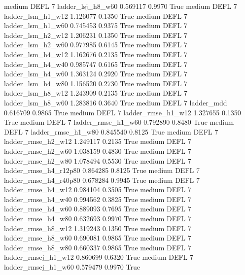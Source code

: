     medium     DEFL                 7      ladder_lsj_h8_w60   0.569117      0.9970    True
    medium     DEFL                 7      ladder_lsm_h1_w12   1.126077      0.1350    True
    medium     DEFL                 7      ladder_lsm_h1_w60   0.745453      0.9375    True
    medium     DEFL                 7      ladder_lsm_h2_w12   1.206231      0.1350    True
    medium     DEFL                 7      ladder_lsm_h2_w60   0.977985      0.6145    True
    medium     DEFL                 7      ladder_lsm_h4_w12   1.162676      0.2135    True
    medium     DEFL                 7      ladder_lsm_h4_w40   0.985747      0.6165    True
    medium     DEFL                 7      ladder_lsm_h4_w60   1.363124      0.2920    True
    medium     DEFL                 7      ladder_lsm_h4_w80   1.156520      0.2730    True
    medium     DEFL                 7      ladder_lsm_h8_w12   1.243909      0.2135    True
    medium     DEFL                 7      ladder_lsm_h8_w60   1.283816      0.3640    True
    medium     DEFL                 7             ladder_mdd   0.616709      0.9865    True
    medium     DEFL                 7     ladder_rmse_h1_w12   1.327655      0.1350    True
    medium     DEFL                 7     ladder_rmse_h1_w60   0.792890      0.8480    True
    medium     DEFL                 7     ladder_rmse_h1_w80   0.845540      0.8125    True
    medium     DEFL                 7     ladder_rmse_h2_w12   1.249117      0.2135    True
    medium     DEFL                 7     ladder_rmse_h2_w60   1.038159      0.4830    True
    medium     DEFL                 7     ladder_rmse_h2_w80   1.078494      0.5530    True
    medium     DEFL                 7  ladder_rmse_h4_r12p80   0.864285      0.8125    True
    medium     DEFL                 7  ladder_rmse_h4_r40p80   0.678284      0.9945    True
    medium     DEFL                 7     ladder_rmse_h4_w12   0.984104      0.3505    True
    medium     DEFL                 7     ladder_rmse_h4_w40   0.994562      0.3825    True
    medium     DEFL                 7     ladder_rmse_h4_w60   0.889093      0.7695    True
    medium     DEFL                 7     ladder_rmse_h4_w80   0.632693      0.9970    True
    medium     DEFL                 7     ladder_rmse_h8_w12   1.319243      0.1350    True
    medium     DEFL                 7     ladder_rmse_h8_w60   0.690081      0.9865    True
    medium     DEFL                 7     ladder_rmse_h8_w80   0.660337      0.9865    True
    medium     DEFL                 7    ladder_rmsej_h1_w12   0.860699      0.6320    True
    medium     DEFL                 7    ladder_rmsej_h1_w60   0.579479      0.9970    True
